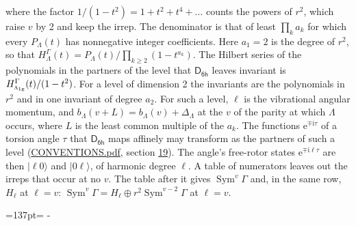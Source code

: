 \documentclass[10pt,a4paper]{article}
\newcommand{\needspace}[1]{\par\penalty-100\begingroup\dimen0=#1\relax\dimen2=\pagegoal
  \advance\dimen2-\pagetotal\ifdim\dimen0>\dimen2\relax\ifdim\dimen2>0pt\vfil\break\fi\fi
  \endgroup}
\numberwithin{equation}{section}
\newcommand{\grp}[1]{\mathsf{#1}}
\newcommand{\irr}[1]{\text{\normalfont\scshape #1}}
\newcommand{\ptag}[1]{\mathrm{#1}}
\newcommand{\iunit}{\mathrm{i}}
\newcommand{\expe}{\mathrm{e}}
\newcommand{\occ}[1]{\lvert #1\rangle}
\begin{document}
where the factor $1/(1 - t^2) = 1 + t^2 + t^4 + \dots$ counts the powers of $r^2$, which raise $v$ by 2 and keep the irrep. The denominator is that of least $\prod_k a_k$ for which every $P_\Lambda(t)$ has nonnegative integer coefficients. Here $a_1 = 2$ is the degree of $r^2$, so that $H^{\Gamma}_\Lambda(t) = P_\Lambda(t)/\prod_{k\ge2}(1 - t^{a_k})$. The Hilbert series of the polynomials in the partners of the level that $\grp{D_{6h}}$ leaves invariant is $H^{\Gamma}_{\irr{a}_{1\ptag{g}}}(t)/(1 - t^2)$. For a level of dimension 2 the invariants are the polynomials in $r^2$ and in one invariant of degree $a_2$. \label{n:index.overtone.period}\label{n:index.increment.unitary}For such a level, $\ell$ is the vibrational angular momentum, and $b_\Lambda(v + L) = b_\Lambda(v) + \Delta_\Lambda$ at the $v$ of the parity at which $\Lambda$ occurs, where $L$ is the least common multiple of the $a_k$. \label{n:local.torsion.angle}The functions $\expe^{\mp\iunit\tau}$ of a torsion angle $\tau$ that $\grp{D_{6h}}$ maps affinely may transform as the partners of such a level (\href{../../CONVENTIONS.pdf}{CONVENTIONS.pdf}, section \href{../../CONVENTIONS.pdf\#conv.19}{19}). The angle's free-rotor states $\expe^{\mp\iunit\ell\tau}$ are then $\occ{\ell 0}$ and $\occ{0 \ell}$, of harmonic degree $\ell$. A table of numerators leaves out the irreps that occur at no $v$. The table after it gives $\operatorname{Sym}^{v}\Gamma$ and, in the same row, $H_\ell$ at $\ell = v$: $\operatorname{Sym}^{v}\Gamma = H_\ell \oplus r^2\operatorname{Sym}^{v-2}\Gamma$ at $\ell = v$.
\needspace{137pt}
\end{document}
